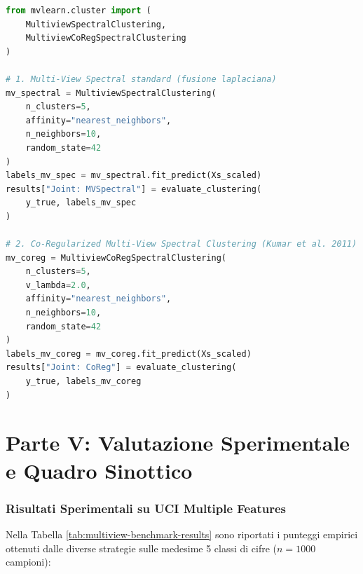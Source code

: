 \begin{lstlisting}[language=Python, caption={Esecuzione di Multi-View Spectral Clustering e Co-Regularized Spectral Clustering.}]
from mvlearn.cluster import (
    MultiviewSpectralClustering,
    MultiviewCoRegSpectralClustering
)

# 1. Multi-View Spectral standard (fusione laplaciana)
mv_spectral = MultiviewSpectralClustering(
    n_clusters=5,
    affinity="nearest_neighbors",
    n_neighbors=10,
    random_state=42
)
labels_mv_spec = mv_spectral.fit_predict(Xs_scaled)
results["Joint: MVSpectral"] = evaluate_clustering(
    y_true, labels_mv_spec
)

# 2. Co-Regularized Multi-View Spectral Clustering (Kumar et al. 2011)
mv_coreg = MultiviewCoRegSpectralClustering(
    n_clusters=5,
    v_lambda=2.0,
    affinity="nearest_neighbors",
    n_neighbors=10,
    random_state=42
)
labels_mv_coreg = mv_coreg.fit_predict(Xs_scaled)
results["Joint: CoReg"] = evaluate_clustering(
    y_true, labels_mv_coreg
)
\end{lstlisting}

\FloatBarrier
\section{Parte V: Valutazione Sperimentale e Quadro Sinottico}
\label{sec:lab-experimental-comparison}

\subsubsection{Risultati Sperimentali su UCI Multiple Features}
Nella Tabella \ref{tab:multiview-benchmark-results} sono riportati i punteggi empirici ottenuti dalle diverse strategie sulle medesime 5 classi di cifre ($n=1000$ campioni):

